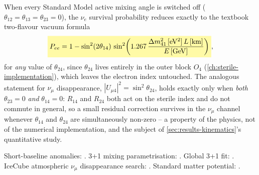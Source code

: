\begin{theorybox}
When every Standard Model active mixing angle is switched off
($\theta_{12}=\theta_{13}=\theta_{23}=0$), the $\nu_e$ survival probability
reduces exactly to the textbook two-flavour vacuum formula
\begin{equation}
  \keyresult{P_{ee} = 1 - \sin^2(2\theta_{14})\,\sin^2\!\left(1.267\,\frac{\Delta m^2_{41}\,[\mathrm{eV^2}]\,L\,[\mathrm{km}]}{E\,[\mathrm{GeV}]}\right)},
\end{equation}
for \emph{any} value of $\theta_{24}$, since $\theta_{24}$ lives entirely
in the outer block $O_4$ (\cref{ch:sterile-implementation}), which leaves
the electron index untouched. The analogous statement for $\nu_\mu$
disappearance, $|U_{\mu4}|^2=\sin^2\theta_{24}$, holds exactly only when
\emph{both} $\theta_{23}=0$ \emph{and} $\theta_{14}=0$: $R_{14}$ and
$R_{24}$ both act on the sterile index and do not commute in general, so a
small residual correction survives in the $\nu_\mu$ channel whenever
$\theta_{14}$ and $\theta_{24}$ are simultaneously non-zero -- a property
of the physics, not of the numerical implementation, and the subject of
\cref{sec:results-kinematics}'s quantitative study.
\end{theorybox}

\begin{refbox}
Short-baseline anomalies: \cite{Aguilar2001LSND,AguilarArevalo2018MiniBooNE,Mention2011ReactorAnomaly,GiuntiLaveder2011GalliumAnomaly}.
3+1 mixing parametrisation: \cite{KoppMachadoMaltoniSchwetz2013}. Global 3+1
fit: \cite{GariazzoGiuntiLavederLi2017}. IceCube atmospheric $\nu_\mu$
disappearance search: \cite{IceCube2020SterileNumuDisappearance}. Standard
matter potential: \cite{Wolfenstein1978}.
\end{refbox}
